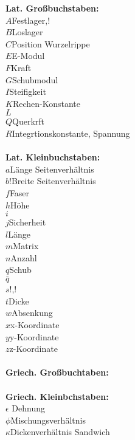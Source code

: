 \begin{tabbing}

\textbf{Lat. Großbuchstaben:}\\
$A$\quad\quad Festlager,!\\
$B$\quad\quad Loslager\\
$C$\quad\quad Position Wurzelrippe\\
$E$\quad\quad E-Modul\\
$F$\quad\quad Kraft\\
$G$\quad\quad Schubmodul\\
$I$\quad\quad Steifigkeit\\
$K$\quad\quad Rechen-Konstante\\
$L$\quad\quad \\
$Q$\quad\quad Querkrft\\
$R$\quad\quad Integrtionskonstante, Spannung\\
\\
\noindent\textbf{Lat. Kleinbuchstaben:}\\
$a$\quad\quad Länge Seitenverhältnis\\
$b$!\quad\quad Breite Seitenverhältnis\\
$f$\quad\quad Faser\\
$h$\quad\quad Höhe\\
$i$\quad\quad \\
$j$\quad\quad Sicherheit\\
$l$\quad\quad Länge\\
$m$\quad\quad Matrix\\
$n$\quad\quad Anzahl\\
$q$\quad\quad Schub\\
$\bar{q}$\quad\quad\\
$s$\quad\quad !,!\\
$t$\quad\quad Dicke\\
$w$\quad\quad Absenkung\\
$x$\quad\quad x-Koordinate\\
$y$\quad\quad y-Koordinate\\
$z$\quad\quad z-Koordinate\\
\\
\noindent\textbf{Griech. Großbuchtaben:}\\
\\
\noindent\textbf{Griech. Kleinbchstaben:}\\
$\epsilon$ \quad\quad Dehnung\\
$\phi$\quad\quad Mischungsverhältnis\\
$\kappa$\quad\quad Dickenverhältnis Sandwich\\

\end{tabbing}

